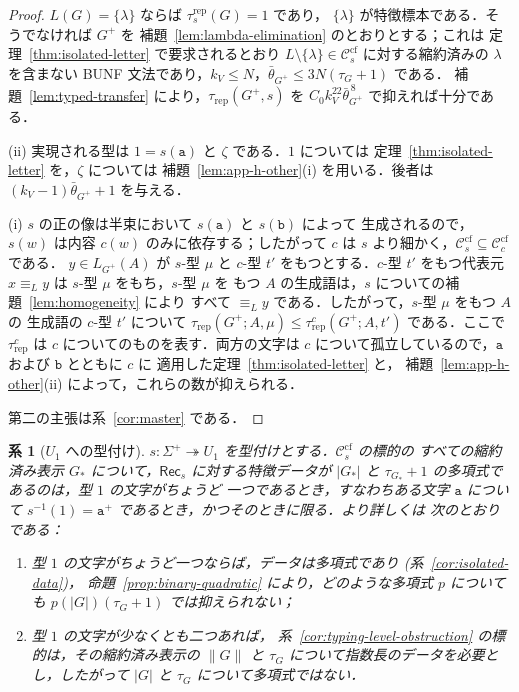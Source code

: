 \documentclass[11pt,a4paper]{ltjsarticle}
\numberwithin{equation}{section}
\theoremstyle{plain}
\newtheorem{corollary}[theorem]{系}
\theoremstyle{definition}
\theoremstyle{remark}
\theoremstyle{plain}
\newcommand{\cf}{\mathrm{cf}}
\newcommand{\Ccf}[1]{\mathcal C_{#1}^{\cf}}
\newcommand{\Rec}{\mathsf{Rec}}
\newcommand{\trep}{\tau_{\mathrm{rep}}}
\begin{document}
\begin{proof}
$L(G)=\{\lambda\}$ ならば $\tau^{\mathrm{rep}}_s(G)=1$ であり，
$\{\lambda\}$ が特徴標本である．そうでなければ $G^+$ を
補題~\ref{lem:lambda-elimination} のとおりとする；これは
定理~\ref{thm:isolated-letter} で要求されるとおり
$L\setminus\{\lambda\}\in\Ccf{s}$ に対する縮約済みの $\lambda$ を含まない
BUNF 文法であり，$k_V\le N$，$\bar\theta_{G^+}\le3N(\tau_G+1)$ である．
補題~\ref{lem:typed-transfer} により，$\trep(G^+,s)$ を
$C_0k_V^{22}\bar\theta_{G^+}^{\,8}$ で抑えれば十分である．

(ii) 実現される型は $1=s(\mathtt a)$ と $\zeta$ である．$1$ については
定理~\ref{thm:isolated-letter} を，$\zeta$ については
補題~\ref{lem:app-h-other}(i) を用いる．後者は
$(k_V-1)\bar\theta_{G^+}+1$ を与える．

(i) $s$ の正の像は半束において $s(\mathtt a)$ と $s(\mathtt b)$ によって
生成されるので，$s(w)$ は内容 $c(w)$ のみに依存する；したがって $c$ は
$s$ より細かく，$\Ccf{s}\subseteq\Ccf{c}$ である．
$y\in L_{G^+}(A)$ が $s$-型 $\mu$ と $c$-型 $t'$ をもつとする．$c$-型
$t'$ をもつ代表元 $x\equiv_L y$ は $s$-型 $\mu$ をもち，$s$-型 $\mu$ を
もつ $A$ の生成語は，$s$ についての補題~\ref{lem:homogeneity} により
すべて $\equiv_L y$ である．したがって，$s$-型 $\mu$ をもつ $A$ の
生成語の $c$-型 $t'$ について
$\trep(G^+;A,\mu)\le\tau^{c}_{\mathrm{rep}}(G^+;A,t')$ である．ここで
$\tau^{c}_{\mathrm{rep}}$ は $c$ についてのものを表す．両方の文字は $c$
について孤立しているので，$\mathtt a$ および $\mathtt b$ とともに $c$ に
適用した定理~\ref{thm:isolated-letter} と，
補題~\ref{lem:app-h-other}(ii) によって，これらの数が抑えられる．

第二の主張は系~\ref{cor:master} である．
\end{proof}

\begin{corollary}[$U_1$ への型付け]
\label{cor:u1-classification}
$s:\Sigma^+\twoheadrightarrow U_1$ を型付けとする．$\Ccf{s}$ の標的の
すべての縮約済み表示 $G_*$ について，$\Rec_s$ に対する特徴データが
$|G_*|$ と $\tau_{G_*}+1$ の多項式であるのは，型 $1$ の文字がちょうど
一つであるとき，すなわちある文字 $\mathtt a$ について
$s^{-1}(1)=\mathtt a^+$ であるとき，かつそのときに限る．より詳しくは
次のとおりである：
\begin{enumerate}[label=\textup{(\roman*)},leftmargin=*]
\item 型 $1$ の文字がちょうど一つならば，データは多項式であり
\textup(系~\ref{cor:isolated-data}\textup)，
命題~\ref{prop:binary-quadratic} により，どのような多項式 $p$ についても
$p(|G|)(\tau_G+1)$ では抑えられない；
\item 型 $1$ の文字が少なくとも二つあれば，
系~\ref{cor:typing-level-obstruction} の標的は，その縮約済み表示の
$\|G\|$ と $\tau_G$ について指数長のデータを必要とし，したがって $|G|$
と $\tau_G$ について多項式ではない．
\end{enumerate}
\end{corollary}
\end{document}
